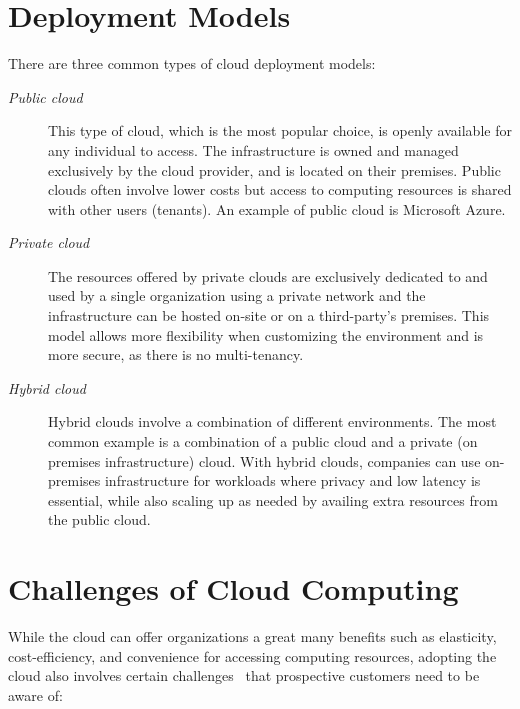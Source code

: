 \section{Deployment Models}
There are three common types of cloud deployment models:~\cite{nist,c2,PvsH}
\begin{description}
    \item [\textit{Public cloud}] This type of cloud, which is the most popular choice, is openly available for any individual to access. The infrastructure is owned and managed exclusively by the cloud provider, and is located on their premises. Public clouds often involve lower costs but access to computing resources is shared with other users (tenants). An example of public cloud is Microsoft Azure.

    \item [\textit{Private cloud}] The resources offered by private clouds are exclusively dedicated to and used by a single organization using a private network and the infrastructure can be hosted on-site or on a third-party's premises. This model allows more flexibility when customizing the environment and is more secure, as there is no multi-tenancy.

    \item [\textit{Hybrid cloud}] Hybrid clouds involve a combination of different environments. The most common example is a combination of a public cloud and a private (on premises infrastructure) cloud. With hybrid clouds, companies can use on-premises infrastructure for workloads where privacy and low latency is essential, while also scaling up as needed by availing extra resources from the public cloud.
\end{description}


\section{Challenges of Cloud Computing}
While the cloud can offer organizations a great many benefits such as elasticity, cost-efficiency, and convenience for accessing computing resources, adopting the cloud also involves certain challenges~\cite{c2,armbrust} that prospective customers need to be aware of:

